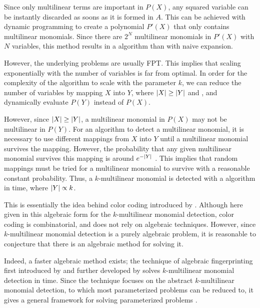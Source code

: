 Since only multilinear terms are important in $P(X)$, 
any squared variable can be instantly discarded as soons as it is formed in $A$. 
This can be achieved with dynamic programming to create a polynomial $P'(X)$ that 
only contains multilinear monomials. Since there are $2^N$ multilinear monomials in $P'(X)$ with 
$N$ variables, this method results in a
 algorithm than with naive expansion.

However, the underlying problems are usually FPT. This implies that scaling exponentially 
with the number of variables is far from optimal. In order for the complexity of the algorithm to scale 
with the parameter $k$, we can reduce the number of variables by mapping $X$ into $Y$, where 
${\left\vert X\right\vert} \geq {\left\vert Y\right\vert}$ and
, and dynamically evaluate $P(Y)$ instead of
$P(X)$. 

However, since ${\left\vert X\right\vert} \geq {\left\vert Y\right\vert}$, a multilinear monomial in $P(X)$ may not be multilinear in $P(Y)$. 
For an algorithm to detect a multilinear monomial, it is necessary to use different mappings 
from $X$ into $Y$ until a multilinear monomial survives the mapping. However, the probability 
that any given multilinear monomial survives this mapping is around $e^{-{\left\vert Y\right\vert}}$ \cite{KouWil15}.
This implies that
 random mappings must be tried for a
multilinear monomial to survive with a reasonable constant probability. Thus, a
$k$-multilinear monomial is detected with a 
 algorithm in  time, where ${\left\vert Y\right\vert} \propto k$.

This is essentially the idea behind color coding introduced by \citeauthor{Alon95} \cite{Alon95}. 
Although here given in this algebraic form for the $k$-multilinear monomial detection, 
color coding is combinatorial, and does not rely on algebraic techniques. 
However, since $k$-multilinear monomial detection is a purely algebraic problem, it is reasonable to 
conjecture that there is an algebraic method for solving it.

Indeed, a faster algebraic method exists; the technique of algebraic fingerprinting 
first introduced by \citeauthor{Koutis08} \cite{Koutis08} and 
further developed by \citeauthor{Williams09} \cite{Williams09} 
solves $k$-multilinear monomial detection in  time. 
Since the technique focuses on the abstract $k$-multilinear monomial detection, to which 
most parameterized problems can be reduced to, it gives a general framework for 
solving parameterized problems \cite{KouWil15}.

